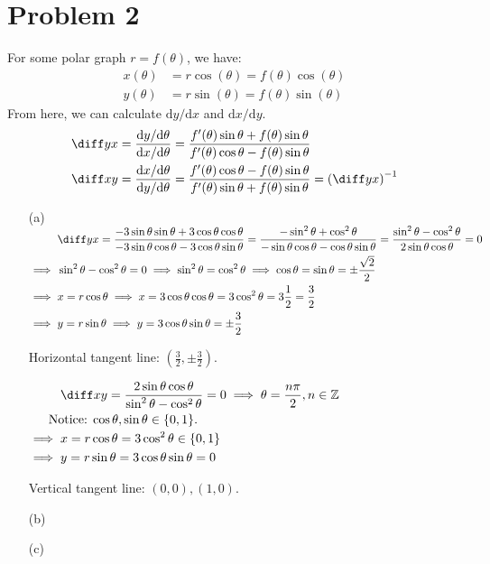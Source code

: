 \documentclass[preview, margin=0.6in]{standalone}
\newcommand{\alignedintertext}[1]{%
  \noalign{%
    \vtop{\hsize=\linewidth#1\par
    \expandafter}%
    \expandafter\prevdepth\the\prevdepth
  }%
}
\newcommand*{\problem}[1]{\section*{Problem #1}}
\begin{document}
\problem{2}
\begin{mdframed}
	For some polar graph $r=f(\theta)$, we have:
	\begin{align*}
		x(\theta)&=r\cos(\theta)=f(\theta)\cos(\theta) \\
		y(\theta)&=r\sin(\theta)=f(\theta)\sin(\theta)
	\end{align*}
	From here, we can calculate $\mathrm{d}y/\mathrm{d}x$ and $\mathrm{d}x/\mathrm{d}y$.
	\begin{align*}
		\diff yx
		&=\frac{\mathrm{d}y/\mathrm{d}\theta}{\mathrm{d}x/\mathrm{d}\theta}
		=\frac{f'(\theta)\sin\theta+f(\theta)\sin\theta}{f'(\theta)\cos\theta-f(\theta)\sin\theta} \\
		\diff xy
		&=\frac{\mathrm{d}x/\mathrm{d}\theta}{\mathrm{d}y/\mathrm{d}\theta}
		=\frac{f'(\theta)\cos\theta-f(\theta)\sin\theta}{f'(\theta)\sin\theta+f(\theta)\sin\theta}
		=\left(\diff yx\right)^{-1}
	\end{align*}
\end{mdframed}
\begin{itemize}
\item[(a)]
$\begin{aligned}[t]
	&{}\diff yx
	=\frac{-3\sin\theta\sin\theta+3\cos\theta\cos\theta}{-3\sin\theta\cos\theta-3\cos\theta\sin\theta}
	=\frac{-\sin^2\theta+\cos^2\theta}{-\sin\theta\cos\theta-\cos\theta\sin\theta}
	=\frac{\sin^2\theta-\cos^2\theta}{2\sin\theta\cos\theta}=0 \\
	\implies{}&\sin^2\theta-\cos^2\theta=0
	\implies \sin^2\theta=\cos^2\theta
	\implies \cos\theta=\sin\theta=\pm \frac{\sqrt{2}}{2} \\
	\implies{}& x=r\cos\theta
	\implies x=3\cos\theta\cos\theta
	=3\cos^2\theta
	=3 \frac{1}{2}
	=\frac{3}{2} \\
	\implies{}& y=r\sin\theta
	\implies y=3\cos\theta\sin\theta
	=\pm \frac{3}{2}
\end{aligned}$

Horizontal tangent line: $\displaystyle \left(\frac32,\pm\frac32\right)$.

$\begin{aligned}[t]
	&\diff xy= \frac{2\sin\theta\cos\theta}{\sin^2\theta-\cos^2\theta}=0\implies \theta=\frac{n\pi}{2},n\in\mathbb Z \\
	\alignedintertext{Notice: $\cos\theta,\sin\theta\in \left\{0,1\right\}$.}
	\implies{}& x=r\cos\theta=3\cos^2\theta\in\{0,1\} \\
	\implies{}& y=r\sin\theta=3\cos\theta\sin\theta=0
\end{aligned}$

Vertical tangent line: $(0,0),(1,0)$.

\item[(b)]
\item[(c)]
\end{itemize}
\end{document}
